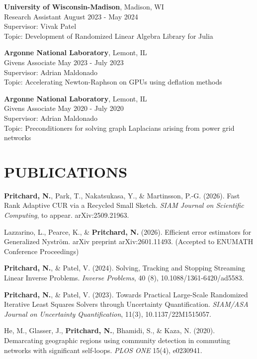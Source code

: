 \documentclass[margin,11pt]{res}
\def\nwp{\textbf{Pritchard, N.}}
\begin{document}
\begin{resume}
                {\bf University of Wisconsin-Madison}, \hfill Madison, WI\\
                Research Assistant \hfill August 2023 - May 2024\\
                Supervisor: Vivak Patel\\
                Topic: Development of Randomized Linear Algebra Library for Julia
                
                {\bf Argonne National Laboratory}, \hfill Lemont, IL\\
                Givens Associate \hfill May 2023 - July 2023\\
                Supervisor: Adrian Maldonado\\
                Topic: Accelerating Newton-Raphson on GPUs using deflation methods
                
                {\bf Argonne National Laboratory}, \hfill Lemont, IL\\
                Givens Associate \hfill May 2020 - July 2020\\
                Supervisor: Adrian Maldonado\\
                Topic: Preconditioners for solving graph Laplacians arising from power grid networks
               


\section{PUBLICATIONS}

\nwp, Park, T., Nakatsukasa, Y., \& Martinsson, P.-G. (2026). Fast Rank Adaptive CUR via a Recycled Small Sketch. \textit{SIAM Journal on Scientific Computing}, to appear. arXiv:2509.21963.

Lazzarino, L., Pearce, K., \& \nwp{} (2026). Efficient error estimators for Generalized Nyström. arXiv preprint arXiv:2601.11493. (Accepted to ENUMATH Conference Proceedings)

\nwp, \& Patel, V. (2024). Solving, Tracking and Stopping Streaming Linear Inverse Problems. \textit{Inverse Problems}, 40 (8), 10.1088/1361-6420/ad5583.

\nwp, \& Patel, V. (2023). Towards Practical Large-Scale Randomized Iterative Least Squares Solvers through Uncertainty Quantification. \textit{SIAM/ASA Journal on Uncertainty Quantification}, 11(3), 10.1137/22M1515057. 

He, M., Glasser, J., \nwp, Bhamidi, S., \& Kaza, N. (2020). Demarcating geographic regions using community detection in commuting networks with significant self-loops. \textit{PLOS ONE} 15(4), e0230941.


\end{resume}
\end{document}
